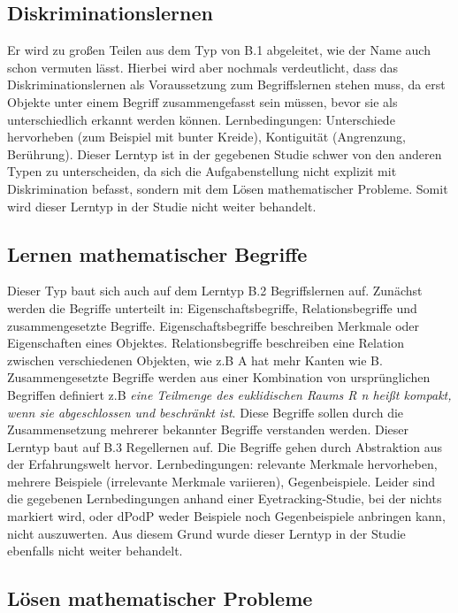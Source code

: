 \subsection[]{Diskriminationslernen}

Er wird zu großen Teilen aus dem Typ von B.1 abgeleitet, wie der Name auch schon vermuten lässt. Hierbei wird aber nochmals verdeutlicht, dass das Diskriminationslernen als Voraussetzung zum Begriffslernen stehen muss, da erst Objekte unter einem Begriff zusammengefasst sein müssen, bevor sie als unterschiedlich erkannt werden können.
Lernbedingungen: Unterschiede hervorheben (zum Beispiel mit bunter Kreide), Kontiguität (Angrenzung, Berührung)\cite{DudenKontiguitaet}.
Dieser Lerntyp ist in der gegebenen Studie schwer von den anderen Typen zu unterscheiden, da sich die Aufgabenstellung nicht explizit mit Diskrimination befasst, sondern mit dem Lösen mathematischer Probleme. Somit wird dieser Lerntyp in der Studie nicht weiter behandelt.

\subsection[]{Lernen mathematischer Begriffe}

Dieser Typ baut sich auch auf dem Lerntyp B.2 Begriffslernen auf. Zunächst werden die Begriffe unterteilt in: Eigenschaftsbegriffe, Relationsbegriffe und zusammengesetzte Begriffe. Eigenschaftsbegriffe beschreiben Merkmale oder Eigenschaften eines Objektes. Relationsbegriffe beschreiben eine Relation zwischen verschiedenen Objekten, wie z.B A hat mehr Kanten wie B. Zusammengesetzte Begriffe werden aus einer Kombination von ursprünglichen Begriffen definiert z.B \textit {eine Teilmenge des euklidischen Raums R n heißt kompakt, wenn sie abgeschlossen und beschränkt ist}. Diese Begriffe sollen durch die Zusammensetzung mehrerer bekannter Begriffe verstanden werden. Dieser Lerntyp baut auf B.3 Regellernen auf. Die Begriffe gehen durch Abstraktion aus der Erfahrungswelt hervor.
Lernbedingungen: relevante Merkmale hervorheben, mehrere Beispiele (irrelevante Merkmale variieren), Gegenbeispiele.
Leider sind die gegebenen Lernbedingungen anhand einer Eyetracking-Studie, bei der nichts markiert wird, oder \gls{dPodP} weder Beispiele noch Gegenbeispiele anbringen kann, nicht auszuwerten. Aus diesem Grund wurde dieser Lerntyp in der Studie ebenfalls nicht weiter behandelt. 

\subsection[]{Lösen mathematischer Probleme}

